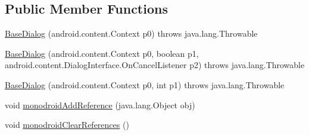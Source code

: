 \subsection*{Public Member Functions}
\begin{DoxyCompactItemize}
\item 
\hyperlink{classfieldservice_1_1android_1_1dialogs_1_1_base_dialog_aadd6a3adecbdd3cf87939cf6bd6fa42f}{Base\+Dialog} (android.\+content.\+Context p0)  throws java.\+lang.\+Throwable 	
\item 
\hyperlink{classfieldservice_1_1android_1_1dialogs_1_1_base_dialog_a3c9033c6d58107a2b48f36b72ca3bcfb}{Base\+Dialog} (android.\+content.\+Context p0, boolean p1, android.\+content.\+Dialog\+Interface.\+On\+Cancel\+Listener p2)  throws java.\+lang.\+Throwable 	
\item 
\hyperlink{classfieldservice_1_1android_1_1dialogs_1_1_base_dialog_ac0a9268a400edf10aadf12d2f567c8fd}{Base\+Dialog} (android.\+content.\+Context p0, int p1)  throws java.\+lang.\+Throwable 	
\item 
void \hyperlink{classfieldservice_1_1android_1_1dialogs_1_1_base_dialog_a2a2eef02b0717825c9e55b2c42760a40}{monodroid\+Add\+Reference} (java.\+lang.\+Object obj)
\item 
void \hyperlink{classfieldservice_1_1android_1_1dialogs_1_1_base_dialog_aefc4fb3d1a75fdfdb25fc3d6cccdb651}{monodroid\+Clear\+References} ()
\end{DoxyCompactItemize}


